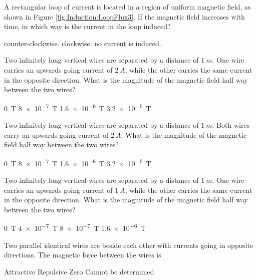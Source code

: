\question A rectangular loop of current is located in a region of uniform magnetic field, as shown in Figure \ref{fig:Induction:LoopFlux3}. If the magnetic field increases with time, in which way is the current in the loop induced?
\begin{checkboxes}
	\choice counter-clockwise.
	\CorrectChoice clockwise.
	\choice no current is induced.
\end{checkboxes}


\question Two infinitely long  vertical wires are separated by a distance of $\SI{1}{m}$. One wire carries an upwards going current of $\SI{2}{A}$, while the other carries the same current in the opposite direction. What is the magnitude of the magnetic field half way between the two wires?
\begin{checkboxes}
	\choice \SI{0}{T}
	\choice \SI{8e-7}{T}
	\CorrectChoice \SI{1.6e-6}{T}
	\choice \SI{3.2e-6}{T} 
\end{checkboxes}


\question Two infinitely long vertical wires are separated by a distance of $\SI{1}{m}$. Both wires carry an upwards going current of $\SI{2}{A}$. What is the magnitude of the magnetic field half way between the two wires?
\begin{checkboxes}
	\CorrectChoice \SI{0}{T}
	\choice \SI{8e-7}{T}
	\choice \SI{1.6e-6}{T}
	\choice \SI{3.2e-6}{T} 
\end{checkboxes}

\question Two infinitely long vertical wires are separated by a distance of $\SI{1}{m}$. One wire carries an upwards going current of $\SI{1}{A}$, while the other carries the same current in the opposite direction. What is the magnitude of the magnetic field half way between the two wires?
\begin{checkboxes}
	\choice \SI{0}{T}
	\choice \SI{4e-7}{T}
	\CorrectChoice \SI{8e-7}{T}
	\choice \SI{1.6e-6}{T} 
\end{checkboxes}


\question Two parallel identical wires are beside each other with currents going in opposite directions. The magnetic force between the wires is
\begin{checkboxes}
\choice Attractive
\CorrectChoice Repulsive \correct
\choice Zero
\choice Cannot be determined
\end{checkboxes}

